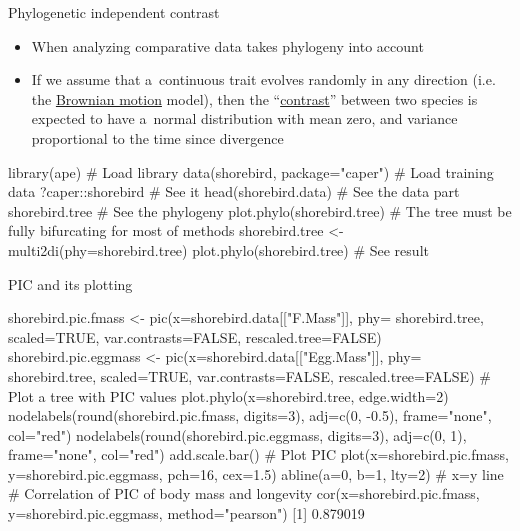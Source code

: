 \documentclass[compress, ucs, xelatex, 11pt, xcolor=svgnames, aspectratio=169,
	hyperref={
		bookmarks=true,
		unicode=true,
		colorlinks=true,
		pdftitle={Molecular data in R},
		plainpages=false,
		pdfauthor={Vojtech Zeisek},
		pdfsubject={Course about phylogeny and evolution in R},
		pdfcreator={XeLaTeX},
		pdfkeywords={R, evolution, phylogeny, molecular data},
		linkcolor=Crimson, %
		anchorcolor=Magenta, %
		citecolor=Magenta, %
		filecolor=Magenta, %
		menucolor=Magenta, %
		urlcolor=DodgerBlue, %
		pdftex},
	url={hyphens, lowtilde} %
	]{beamer}
\begin{document}
\begin{frame}[fragile]{Phylogenetic independent contrast}
	\begin{itemize}
		\item When analyzing comparative data takes phylogeny into account
		\item If we assume that a~continuous trait evolves randomly in any direction (i.e. the \href{https://en.wikipedia.org/wiki/Brownian_motion}{Brownian motion} model), then the \enquote{\href{https://en.wikipedia.org/wiki/Contrast_(statistics)}{contrast}} between two species is expected to have a~normal distribution with mean zero, and variance proportional to the time since divergence
	\end{itemize}
	\begin{spluscode}
    library(ape) # Load library
    data(shorebird, package="caper") # Load training data
    ?caper::shorebird # See it
    head(shorebird.data) # See the data part
    shorebird.tree # See the phylogeny
    plot.phylo(shorebird.tree)
    # The tree must be fully bifurcating for most of methods
    shorebird.tree <- multi2di(phy=shorebird.tree)
    plot.phylo(shorebird.tree) # See result
	\end{spluscode}
\end{frame}

\begin{frame}[fragile]{PIC and its plotting}
	\begin{spluscode}
    shorebird.pic.fmass <- pic(x=shorebird.data[["F.Mass"]], phy=
      shorebird.tree, scaled=TRUE, var.contrasts=FALSE, rescaled.tree=FALSE)
    shorebird.pic.eggmass <- pic(x=shorebird.data[["Egg.Mass"]], phy=
      shorebird.tree, scaled=TRUE, var.contrasts=FALSE, rescaled.tree=FALSE)
    # Plot a tree with PIC values
    plot.phylo(x=shorebird.tree, edge.width=2)
    nodelabels(round(shorebird.pic.fmass, digits=3), adj=c(0, -0.5),
      frame="none", col="red")
    nodelabels(round(shorebird.pic.eggmass, digits=3), adj=c(0, 1),
      frame="none", col="red")
    add.scale.bar()
    # Plot PIC
    plot(x=shorebird.pic.fmass, y=shorebird.pic.eggmass, pch=16, cex=1.5)
    abline(a=0, b=1, lty=2) # x=y line
    # Correlation of PIC of body mass and longevity
    cor(x=shorebird.pic.fmass, y=shorebird.pic.eggmass, method="pearson")
    [1] 0.879019
	\end{spluscode}
\end{frame}
\end{document}
